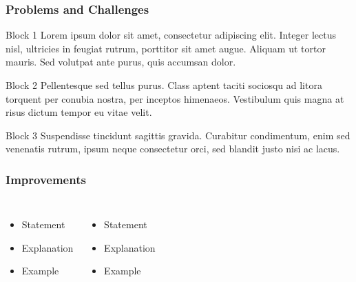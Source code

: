 \documentclass{beamer}
\begin{document}
\begin{frame}
\frametitle{Problems and Challenges}


\begin{block}{Block 1}
Lorem ipsum dolor sit amet, consectetur adipiscing elit. Integer lectus nisl, ultricies in feugiat rutrum, porttitor sit amet augue. Aliquam ut tortor mauris. Sed volutpat ante purus, quis accumsan dolor.
\end{block}

\begin{block}{Block 2}
Pellentesque sed tellus purus. Class aptent taciti sociosqu ad litora torquent per conubia nostra, per inceptos himenaeos. Vestibulum quis magna at risus dictum tempor eu vitae velit.
\end{block}

\begin{block}{Block 3}
Suspendisse tincidunt sagittis gravida. Curabitur condimentum, enim sed venenatis rutrum, ipsum neque consectetur orci, sed blandit justo nisi ac lacus.
\end{block}



\end{frame}


\begin{frame}
\frametitle{Improvements}
\begin{columns}[t] %

\begin{itemize}
\item Statement
\item Explanation
\item Example
\end{itemize}



\begin{itemize}
\item Statement
\item Explanation
\item Example
\end{itemize}

\end{columns}
\end{frame}
\end{document}

